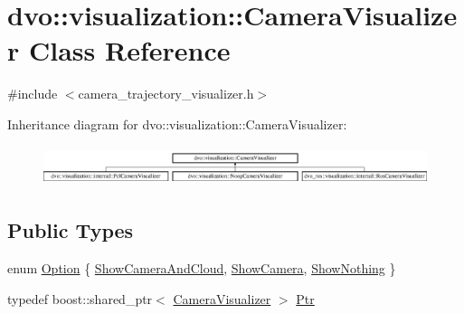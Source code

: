 \hypertarget{classdvo_1_1visualization_1_1_camera_visualizer}{}\section{dvo\+:\+:visualization\+:\+:Camera\+Visualizer Class Reference}
\label{classdvo_1_1visualization_1_1_camera_visualizer}


{\ttfamily \#include $<$camera\+\_\+trajectory\+\_\+visualizer.\+h$>$}

Inheritance diagram for dvo\+:\+:visualization\+:\+:Camera\+Visualizer\+:\begin{figure}[H]
\begin{center}
\leavevmode
\includegraphics[height=1.181435cm]{classdvo_1_1visualization_1_1_camera_visualizer}
\end{center}
\end{figure}
\subsection*{Public Types}
\begin{DoxyCompactItemize}
\item 
enum \mbox{\hyperlink{classdvo_1_1visualization_1_1_camera_visualizer_a0526f50be9f298c4f7d1f91018d50af7}{Option}} \{ \mbox{\hyperlink{classdvo_1_1visualization_1_1_camera_visualizer_a0526f50be9f298c4f7d1f91018d50af7a0ff8fc7d7283f27066e93ca0d4ef3f19}{Show\+Camera\+And\+Cloud}}, 
\mbox{\hyperlink{classdvo_1_1visualization_1_1_camera_visualizer_a0526f50be9f298c4f7d1f91018d50af7a98873907c6c7542969210d4aedf56e68}{Show\+Camera}}, 
\mbox{\hyperlink{classdvo_1_1visualization_1_1_camera_visualizer_a0526f50be9f298c4f7d1f91018d50af7abb664b1b198725856042bb30de426865}{Show\+Nothing}}
 \}
\item 
typedef boost\+::shared\+\_\+ptr$<$ \mbox{\hyperlink{classdvo_1_1visualization_1_1_camera_visualizer}{Camera\+Visualizer}} $>$ \mbox{\hyperlink{classdvo_1_1visualization_1_1_camera_visualizer_a473ebecc62e1d4edba21027d858789a2}{Ptr}}
\end{DoxyCompactItemize}
